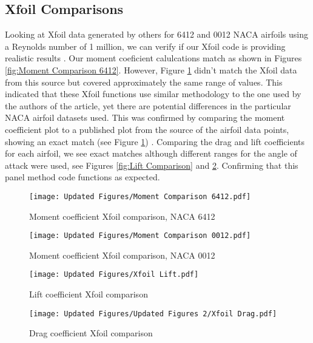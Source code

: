 \documentclass{article}
\begin{document}
\subsection{Xfoil Comparisons}
Looking at Xfoil data generated by others for 6412 and 0012 NACA airfoils using a Reynolds number of 1 million, we can verify if our Xfoil code is providing realistic results \cite{aerotoolbox_lift_drag_moment}. Our moment coeficient calulcations match as shown in Figures  \ref{fig:Moment Comparison 6412}. However, Figure \ref{fig:Moment Comparison 0012} didn't match the Xfoil data from this source but covered approximately the same range of values. This indicated that these Xfoil functions use similar methodology to the one used by the authors of the article, yet there are potential differences in the particular NACA airfoil datasets used. This was confirmed by comparing the moment coefficient plot to a published plot from the source of the airfoil data points, showing an exact match (see Figure \ref{fig:Moment Comparison 0012}) \cite{naca0012h}. Comparing the drag and lift coefficients for each airfoil, we see exact matches although different ranges for the angle of attack were used, see Figures  \ref{fig:Lift Comparison} and \ref{fig:Drag Comparison}. Confirming that this panel method code functions as expected.

\begin{figure}[h]
    \centering
\begin{minipage}[b]{0.45\textwidth}
\centering
\texttt{[image: Updated Figures/Moment Comparison 6412.pdf]}
\caption{\label{fig:Moment Comparison 6412}Moment coefficient Xfoil comparison, NACA 6412}
\end{minipage}
\begin{minipage}[b]{0.45\textwidth}
\centering
\texttt{[image: Updated Figures/Moment Comparison 0012.pdf]}
    \caption{Moment coefficient Xfoil comparison, NACA 0012}
    \label{fig:Moment Comparison 0012}
\end{minipage}
\end{figure}
\begin{figure}[h]
    \centering
\begin{minipage}[b]{0.45\textwidth}
\centering
\texttt{[image: Updated Figures/Xfoil Lift.pdf]}
\caption{\label{fig:Lift Comparison}Lift coefficient Xfoil comparison}
\end{minipage}
\begin{minipage}[b]{0.45\textwidth}
\centering
\texttt{[image: Updated Figures/Updated Figures 2/Xfoil Drag.pdf]}
\caption{\label{fig:Drag Comparison}Drag coefficient Xfoil comparison}
\end{minipage}
\end{figure}
\end{document}
